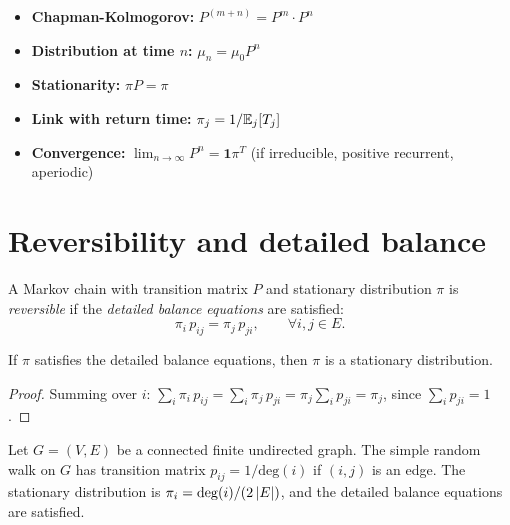 \begin{keyformulas}[title=\textbf{Key Markov chain formulas}]
\begin{itemize}
    \item \textbf{Chapman-Kolmogorov:} $P^{(m+n)} = P^m \cdot P^n$
    \item \textbf{Distribution at time $n$:} $\mu_n = \mu_0 P^n$
    \item \textbf{Stationarity:} $\pi P = \pi$
    \item \textbf{Link with return time:} $\pi_j = 1/\mathbb{E}_j[T_j]$
    \item \textbf{Convergence:} $\lim_{n \to \infty} P^n = \mathbf{1} \pi^T$
    (if irreducible, positive recurrent, aperiodic)
\end{itemize}
\end{keyformulas}

\section{Reversibility and detailed balance}

\begin{definition}[Reversibility]
A Markov chain with transition matrix $P$ and stationary distribution $\pi$ is
\emph{reversible} if the \emph{detailed balance equations} are satisfied:
\[
    \pi_i\, p_{ij} = \pi_j\, p_{ji}, \qquad \forall i, j \in E.
\]
\end{definition}

\begin{proposition}
If $\pi$ satisfies the detailed balance equations, then $\pi$ is a stationary
distribution.
\end{proposition}

\begin{proof}
Summing over $i$:
$\sum_i \pi_i\, p_{ij} = \sum_i \pi_j\, p_{ji} = \pi_j \sum_i p_{ji} = \pi_j$,
since $\sum_i p_{ji} = 1$.
\end{proof}

\begin{example}
Let $G = (V, E)$ be a connected finite undirected graph. The simple random walk on $G$
has transition matrix $p_{ij} = 1/\mathrm{deg}(i)$ if $(i,j)$ is an edge. The
stationary distribution is $\pi_i = \mathrm{deg}(i)/(2\left| E \right|)$, and the detailed
balance equations are satisfied.
\end{example}

